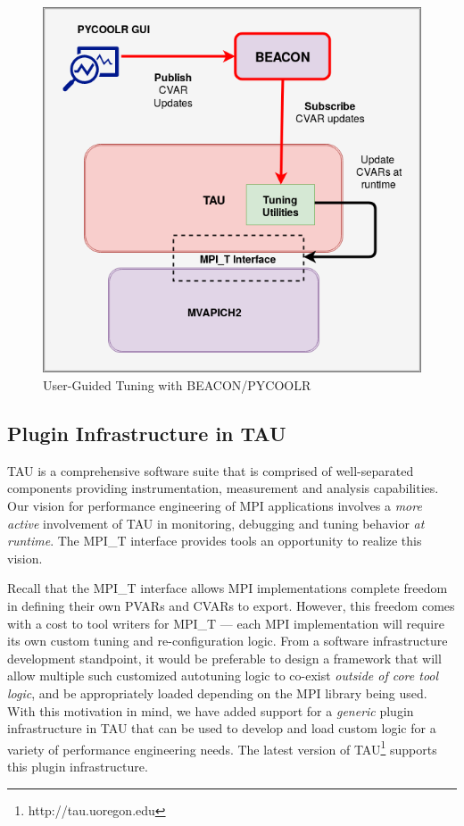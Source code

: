 \begin{center}
        \begin{figure}[tbp!]
        \centering
                \includegraphics[scale=0.4,keepaspectratio]{figures/Manual_Tuning_Design}
                \caption{User-Guided Tuning with BEACON/PYCOOLR}
                \label{fig:manualtuning}
        \end{figure}
\end{center}

\subsection{Plugin Infrastructure in TAU}

TAU is a comprehensive software suite that is comprised of well-separated components providing instrumentation, measurement and analysis capabilities. Our vision for performance engineering of MPI applications involves a \textit{more active} involvement of TAU in monitoring, debugging and tuning behavior \textit{at runtime}. The MPI\_T interface provides tools an opportunity to realize this vision.
\par Recall that the MPI\_T interface allows MPI implementations complete freedom in defining their own PVARs and CVARs to export. However, this freedom comes with a cost to tool writers for MPI\_T --- each MPI implementation will require its own custom tuning and re-configuration logic. From a software infrastructure development standpoint, it would be preferable to design a framework that will allow multiple such customized autotuning logic to co-exist \textit {outside of core tool logic}, and be appropriately loaded depending on the MPI library being used. With this motivation in mind, we have added support for a \textit{generic} plugin infrastructure in TAU that can be used to develop and load custom logic for a variety of performance engineering needs. The latest version of TAU\footnote{http://tau.uoregon.edu} supports this plugin infrastructure.

